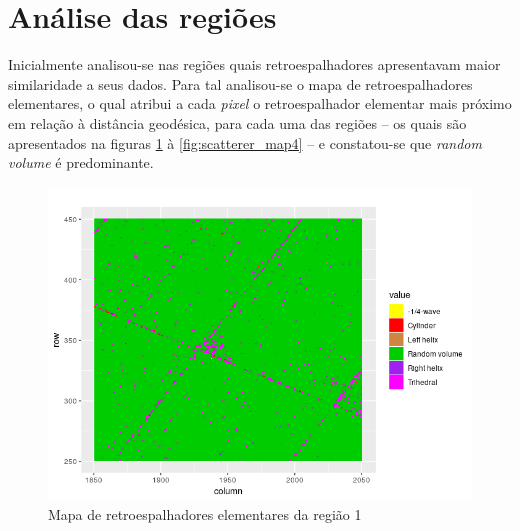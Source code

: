 \documentclass[12pt]{article}
\begin{document}
\section{Análise das regiões}

Inicialmente analisou-se nas regiões quais retroespalhadores apresentavam maior similaridade a seus dados. Para tal analisou-se o mapa de retroespalhadores elementares, o qual atribui a cada \textit{pixel} o retroespalhador elementar mais próximo em relação à distância geodésica, para cada uma das regiões -- os quais são apresentados na figuras \ref{fig:scatterer_map1} à \ref{fig:scatterer_map4} -- e constatou-se que \textit{random volume} é predominante.

\begin{figure}[!h]

  \centering
  \includegraphics[width=\linewidth]{../../Images/Report_19_02_27/scatterer_map_region1.png}
  \caption{Mapa de retroespalhadores elementares da região 1}
  \label{fig:scatterer_map1}

\end{figure}
\end{document}
